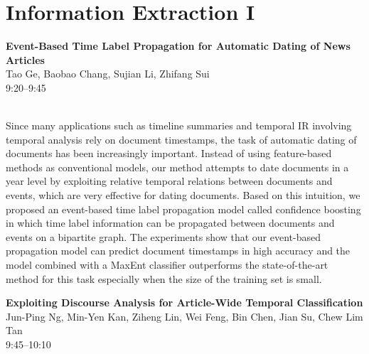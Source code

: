 \documentclass[twoside,makeidx]{book}
\begin{document}
\section{Information Extraction I}
\vspace{-1em}
\par\vspace{2em}\noindent%
\begin{minipage}{\linewidth}%
\begin{center}
\textbf{\normalsize Event-Based Time Label Propagation for Automatic Dating of News Articles}\\
\normalsize  Tao Ge,  Baobao Chang,  Sujian Li,  Zhifang Sui\\
{\small 9:20--9:45}\\
\end{center}
\end{minipage}\\[0.5em]
\nopagebreak%
\noindent%
{\small Since many applications such as timeline summaries and temporal IR involving temporal analysis rely on document timestamps, the task of automatic dating of documents has been increasingly important. Instead of using feature-based methods as conventional models, our method attempts to date documents in a year level by exploiting relative temporal relations between documents and events, which are very effective for dating documents. Based on this intuition, we proposed an event-based time label propagation model called confidence boosting in which time label information can be propagated between documents and events on a bipartite graph. The experiments show that our event-based propagation model can predict document timestamps in high accuracy and the model combined with a MaxEnt classifier outperforms the state-of-the-art method for this task especially when the size of the training set is small.}
\par\vspace{2em}\noindent%
\begin{minipage}{\linewidth}%
\begin{center}
\textbf{\normalsize Exploiting Discourse Analysis for Article-Wide Temporal Classification}\\
\normalsize  Jun-Ping Ng,  Min-Yen Kan,  Ziheng Lin,  Wei Feng,  Bin Chen,  Jian Su,  Chew Lim Tan\\
{\small 9:45--10:10}\\
\end{center}
\end{minipage}\\[0.5em]
\end{document}
